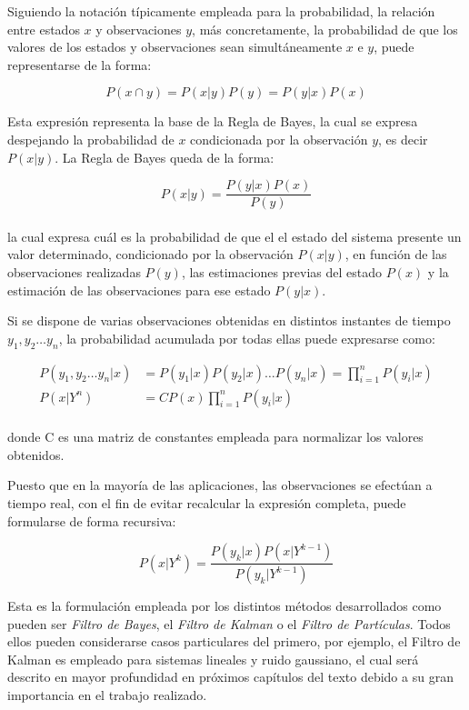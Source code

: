 Siguiendo la notación típicamente empleada para la probabilidad, la relación entre estados $x$ y observaciones $y$, más concretamente, la probabilidad de que los valores de los estados y observaciones sean simultáneamente $x$ e $y$, puede representarse de la forma: 

\[ P(x \cap y) = P(x | y)P(y) = P(y | x)P(x) \]

Esta expresión representa la base de la Regla de Bayes, la cual se expresa despejando la probabilidad de $x$ condicionada por la observación $y$, es decir $P(x | y)$. La Regla de Bayes queda de la forma: 

\begin{equation}
	P(x | y) = \frac{P(y | x)P(x)}{P(y)}
\end{equation} \\
\noindent
la cual expresa cuál es la probabilidad de que el el estado del sistema presente un valor determinado, condicionado por la observación $P(x | y)$, en función de las observaciones realizadas $P(y)$, las estimaciones previas del estado $P(x)$ y la estimación de las observaciones para ese estado $P(y | x)$. \par 

Si se dispone de varias observaciones obtenidas en distintos instantes de tiempo $y_1,y_2 \ldots y_n$, la probabilidad acumulada por todas ellas puede expresarse como:

\[
\begin{split}
	P(y_1,y_2 \ldots y_n |x) &= P(y_1 | x)P(y_2 | x)\ldots P(y_n | x) = \prod_{i=1}^n P(y_i | x) \\
	P(x | Y^n) &= C P(x) \prod_{i=1}^n P(y_i | x)
\end{split}	
\]  \\ 
\noindent
donde C es una matriz de constantes empleada para normalizar los valores obtenidos. \par 

Puesto que en la mayoría de las aplicaciones, las observaciones se efectúan a tiempo real, con el fin de evitar recalcular la expresión completa, puede formularse de forma recursiva:

\begin{equation}
	P(x | Y^k) = \frac{P(y_k | x)P(x | Y^{k-1})}{P(y_k | Y^{k-1})}
\end{equation} 

Esta es la formulación empleada por los distintos métodos desarrollados como pueden ser \emph{Filtro de Bayes}, el \emph{Filtro de Kalman} o el \emph{Filtro de Partículas}. Todos ellos pueden considerarse casos particulares del primero, por ejemplo, el Filtro de Kalman es empleado para sistemas lineales y ruido gaussiano, el cual será descrito en mayor profundidad en próximos capítulos del texto debido a su gran importancia en el trabajo realizado. \par 

